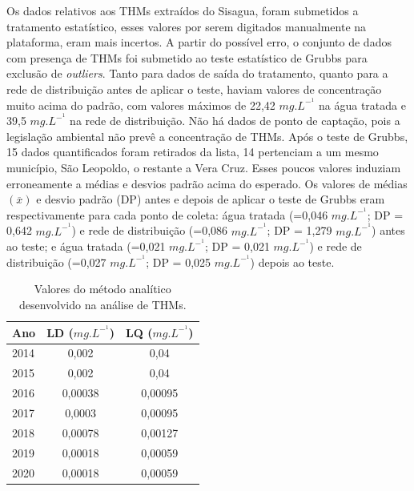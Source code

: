Os dados relativos aos THMs extraídos do Sisagua, foram submetidos a tratamento estatístico, esses valores por serem digitados manualmente na plataforma, eram mais incertos. A partir do possível erro, o conjunto de dados com presença de THMs foi submetido ao teste estatístico de Grubbs para exclusão de \textit{outliers}. Tanto para dados de saída do tratamento, quanto para a rede de distribuição antes de aplicar o teste, haviam valores de concentração muito acima do padrão, com valores máximos de 22,42 $mg.L^-^1$ na água tratada e 39,5 $mg.L^-^1$ na rede de distribuição. Não há dados de ponto de captação, pois a legislação ambiental não prevê a concentração de THMs. Após o teste de Grubbs, 15 dados quantificados foram retirados da lista, 14 pertenciam a um mesmo município, São Leopoldo, o restante a Vera Cruz. Esses poucos valores induziam erroneamente a médias e desvios padrão acima do esperado. Os valores de médias $(\overline{x})$ e desvio padrão (DP) antes e depois de aplicar o teste de Grubbs eram respectivamente para cada ponto de coleta:  água tratada (=0,046 $mg.L^-^1$; DP = 0,642 $mg.L^-^1$) e  rede de distribuição (=0,086 $mg.L^-^1$; DP = 1,279 $mg.L^-^1$) antes ao teste; e água tratada (=0,021 $mg.L^-^1$; DP = 0,021 $mg.L^-^1$) e rede de distribuição (=0,027 $mg.L^-^1$; DP = 0,025 $mg.L^-^1$) depois ao teste.

\begin{table}[!htb]
\centering
\small
\caption{\small Valores do método analítico desenvolvido na análise de THMs.}
\label{tab:com_esp}
    \begin{tabular}{lcc}
    \toprule
    \textbf{Ano} & \textbf{LD ($mg.L^-^1$)} & \textbf{LQ ($mg.L^-^1$)} \\ \hline
      2014   & 0,002 & 0,04\\
      2015 & 0,002 & 0,04 \\
      2016 & 0,00038 & 0,00095 \\ 
      2017 & 0,0003 & 0,00095\\
      2018 & 0,00078 & 0,00127\\
      2019 & 0,00018 & 0,00059\\
      2020 & 0,00018 & 0,00059\\ \bottomrule
    \end{tabular}
    \label{tab01}
\end{table}



